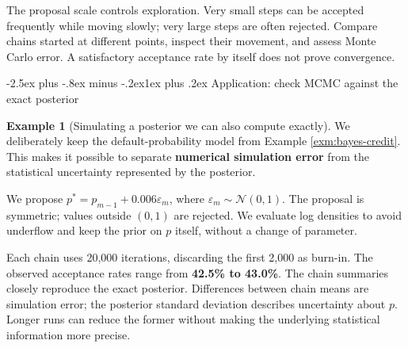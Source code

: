 \documentclass[
  11pt,
]{book}
\makeatletter
\renewcommand\subsection{\@startsection{subsection}{2}{\z@}
  {-2.5ex plus -.8ex minus -.2ex}{1ex plus .2ex}
  {\normalfont\large\bfseries\color{TextbookInk}}}
\theoremstyle{definition}
\theoremstyle{definition}
\newtheorem{example}{Example}[chapter]
\theoremstyle{definition}
\theoremstyle{definition}
\theoremstyle{remark}
\makeatother
\begin{document}
The proposal scale controls exploration. Very small steps can be accepted frequently while moving slowly; very large steps are often rejected. Compare chains started at different points, inspect their movement, and assess Monte Carlo error. A satisfactory acceptance rate by itself does not prove convergence.

\subsection{Application: check MCMC against the exact posterior}\label{application-check-mcmc-against-the-exact-posterior}

\begin{example}[Simulating a posterior we can also compute exactly]
\protect\hypertarget{exm:mh-credit}{}\label{exm:mh-credit}We deliberately keep the default-probability model from Example \ref{exm:bayes-credit}. This makes it possible to separate \textbf{numerical simulation error} from the statistical uncertainty represented by the posterior.

We propose \(p^*=p_{m-1}+0.006\varepsilon_m\), where \(\varepsilon_m\sim\mathcal N(0,1)\). The proposal is symmetric; values outside \((0,1)\) are rejected. We evaluate log densities to avoid underflow and keep the prior on \(p\) itself, without a change of parameter.

\begin{table}[H]
\centering\begingroup\fontsize{10}{12}\selectfont

\endgroup{}
\end{table}

Each chain uses 20,000 iterations, discarding the first 2,000 as burn-in. The observed acceptance rates range from \textbf{42.5\% to 43.0\%}. The chain summaries closely reproduce the exact posterior. Differences between chain means are simulation error; the posterior standard deviation describes uncertainty about \(p\). Longer runs can reduce the former without making the underlying statistical information more precise.


\end{example}
\end{document}
